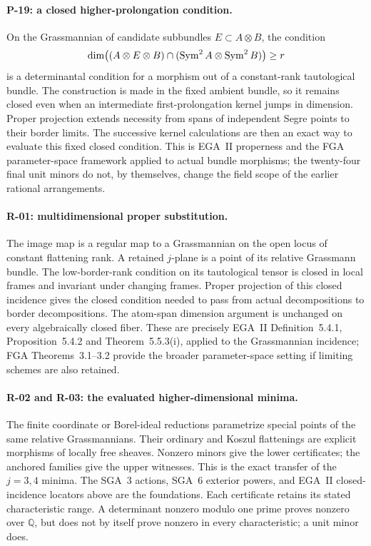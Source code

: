 \paragraph{P-19: a closed higher-prolongation condition.}
On the Grassmannian of candidate subbundles $E\subset A\otimes B$,
the condition
\[
 \dim\bigl((A\otimes E\otimes B)
       \cap(\operatorname{Sym}^2 A\otimes\operatorname{Sym}^2 B)\bigr)\geq r
\]
is a determinantal condition for a morphism out of a
constant-rank tautological bundle. The construction is made
in the fixed ambient bundle, so it remains closed even when
an intermediate first-prolongation kernel jumps in dimension.
Proper projection extends necessity from spans of independent
Segre points to their border limits. The successive kernel
calculations are then an exact way to evaluate this fixed
closed condition. This is EGA~II properness and the FGA
parameter-space framework applied to actual bundle morphisms;
the twenty-four final unit minors do not, by themselves,
change the field scope of the earlier rational arrangements.

\paragraph{R-01: multidimensional proper substitution.}
The image map is a regular map to a Grassmannian on
the open locus of constant flattening rank. A retained
$j$-plane is a point of its relative Grassmann bundle.
The low-border-rank condition on its tautological
tensor is closed in local frames and invariant under
changing frames. Proper projection of this closed
incidence gives the closed condition needed to pass
from actual decompositions to border decompositions.
The atom-span dimension argument is unchanged on
every algebraically closed fiber. These are precisely
EGA~II Definition~5.4.1, Proposition~5.4.2 and
Theorem~5.5.3(i), applied to the Grassmannian incidence;
FGA Theorems~3.1--3.2 provide the broader parameter-space
setting if limiting schemes are also retained.

\paragraph{R-02 and R-03: the evaluated higher-dimensional minima.}
The finite coordinate or Borel-ideal reductions parametrize
special points of the same relative Grassmannians.
Their ordinary and Koszul flattenings are explicit
morphisms of locally free sheaves. Nonzero minors give
the lower certificates; the anchored families give
the upper witnesses. This is the exact transfer of
the $j=3,4$ minima.
The SGA~3 actions, SGA~6 exterior powers, and EGA~II
closed-incidence locators above are the foundations.
Each certificate retains its stated characteristic
range. A determinant nonzero modulo one prime proves
nonzero over $\mathbb Q$, but does not by itself prove
nonzero in every characteristic; a unit minor does.

